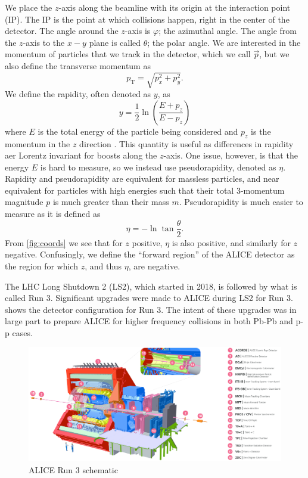 We place the $z$-axis along the beamline with its origin at the interaction point (IP). The IP is the point at which collisions happen, right in the center of the detector. The angle around the $z$-axis is $\varphi$; the azimuthal angle. The angle from the $z$-axis to the $x-y$ plane is called $\theta$; the polar angle. We are interested in the momentum of particles that we track in the detector, which we call $\vec{p}$, but we also define the transverse momentum as 
\begin{equation}
    p_{\mathrm{T}}=\sqrt{p_x^2 + p_y^2}.
    \label{eqn:transverse momentum}
\end{equation}
We define the rapidity, often denoted as $y$, as
\begin{equation}
    y=\frac 12 \ln\left(\frac{E+p_z}{E-p_z}\right)
    \label{eqn:rapidity}
\end{equation}
where $E$ is the total energy of the particle being considered and $p_z$ is the momentum in the $z$ direction \cite{kar_exp_phys}. This quantity is useful as differences in rapidity aer Lorentz invariant for boosts along the $z$-axis. One issue, however, is that the energy $E$ is hard to measure, so we instead use pseudorapidity, denoted as $\eta$. Rapidity and pseudorapidity are equivalent for massless particles, and near equivalent for particles with high energies such that their total 3-momentum magnitude $p$ is much greater than their mass $m$. Pseudorapidity is much easier to measure as it is defined as \cite{kar_exp_phys}
\begin{equation}
    \eta=-\ln\tan\frac{\theta}{2}.
    \label{eqn:pseudorapidity}
\end{equation}
From \cref{fig:coords} we see that for $z$ positive, $\eta$ is also positive, and similarly for $z$ negative. Confusingly, we define the ``forward region'' of the ALICE detector as the region for which $z$, and thus $\eta$, are negative. 

The LHC Long Shutdown 2 (LS2), which started in 2018, is followed by what is called Run 3. Significant upgrades were made to ALICE during LS2 for Run 3.  shows the detector configuration for Run 3. The intent of these upgrades was in large part to prepare ALICE for higher frequency collisions in both Pb-Pb and p-p cases. 

\begin{figure}[h]
    \begin{center}
        \includegraphics[width=.8\textwidth]{Figs/ALICE_RUN3_schematic.png}
        \caption{ALICE Run 3 schematic}
        \label{fig:ALICE_Schematic}
    \end{center}
\end{figure}

